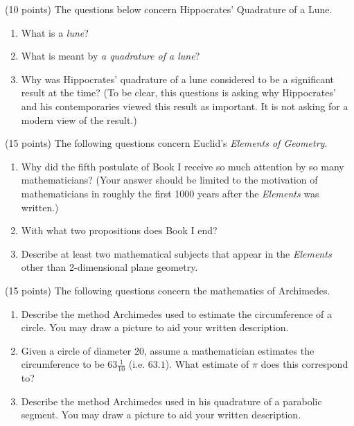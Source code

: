 \documentclass[11pt]{article}
\begin{document}
\item (10 points) The questions below concern Hippocrates' Quadrature of a Lune.
	\begin{enumerate}
	\item What is a \emph{lune}?
	\vfill
	\item What is meant by \emph{a quadrature of a lune}?
	\vfill
	\item Why was Hippocrates' quadrature of a lune considered to be a significant result at the time? (To be clear, this questions is asking why Hippocrates' and his contemporaries viewed this result as important. It is not asking for a modern view of the result.)
	\vfill
	\end{enumerate}
\item (15 points) The following questions concern Euclid's \emph{Elements of Geometry}.
	\begin{enumerate}
	\item Why did the fifth postulate of Book I receive so much attention by so many mathematicians? (Your answer should be limited to the motivation of mathematicians in roughly the first 1000 years after the \emph{Elements} was written.)
	\vfill
	\item With what two propositions does Book I end?
	\vfill
	\item Describe at least two mathematical subjects that appear in the \emph{Elements} other than 2-dimensional plane geometry.
	\vfill	
	\end{enumerate}

\newpage

\item (15 points) The following questions concern the mathematics of Archimedes.
	\begin{enumerate}
	\item Describe the method Archimedes used to estimate the circumference of a circle. You may draw a picture to aid your written description.
	\vfill
	\item Given a circle of diameter 20, assume a mathematician estimates the circumference to be $63\frac{1}{10}$ (i.e. $63.1$). What estimate of $\pi$ does this correspond to?
	\vfill
	\item Describe the method Archimedes used in his quadrature of a parabolic segment. You may draw a picture to aid your written description.
	\vfill
	\end{enumerate}
\newpage
\end{document}
